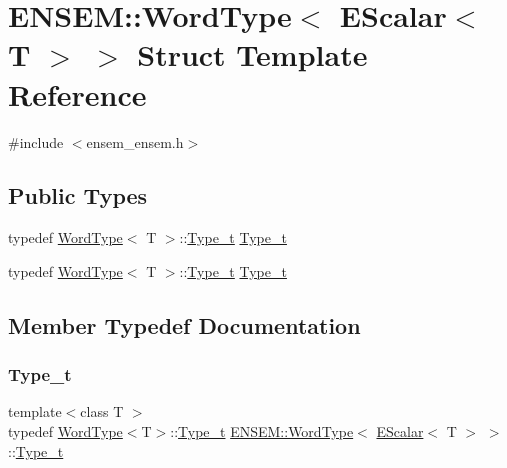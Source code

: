 \hypertarget{structENSEM_1_1WordType_3_01EScalar_3_01T_01_4_01_4}{}\section{E\+N\+S\+EM\+:\+:Word\+Type$<$ E\+Scalar$<$ T $>$ $>$ Struct Template Reference}
\label{structENSEM_1_1WordType_3_01EScalar_3_01T_01_4_01_4}


{\ttfamily \#include $<$ensem\+\_\+ensem.\+h$>$}

\subsection*{Public Types}
\begin{DoxyCompactItemize}
\item 
typedef \mbox{\hyperlink{structENSEM_1_1WordType}{Word\+Type}}$<$ T $>$\+::\mbox{\hyperlink{structENSEM_1_1WordType_3_01EScalar_3_01T_01_4_01_4_adc30dc1892bde666c3cbe7a8ea951497}{Type\+\_\+t}} \mbox{\hyperlink{structENSEM_1_1WordType_3_01EScalar_3_01T_01_4_01_4_adc30dc1892bde666c3cbe7a8ea951497}{Type\+\_\+t}}
\item 
typedef \mbox{\hyperlink{structENSEM_1_1WordType}{Word\+Type}}$<$ T $>$\+::\mbox{\hyperlink{structENSEM_1_1WordType_3_01EScalar_3_01T_01_4_01_4_adc30dc1892bde666c3cbe7a8ea951497}{Type\+\_\+t}} \mbox{\hyperlink{structENSEM_1_1WordType_3_01EScalar_3_01T_01_4_01_4_adc30dc1892bde666c3cbe7a8ea951497}{Type\+\_\+t}}
\end{DoxyCompactItemize}


\subsection{Member Typedef Documentation}
\mbox{\label{structENSEM_1_1WordType_3_01EScalar_3_01T_01_4_01_4_adc30dc1892bde666c3cbe7a8ea951497}} 
\subsubsection{\texorpdfstring{Type\_t}{Type\_t}\hspace{0.1cm}{\footnotesize\ttfamily [1/2]}}
{\footnotesize\ttfamily template$<$class T $>$ \\
typedef \mbox{\hyperlink{structENSEM_1_1WordType}{Word\+Type}}$<$T$>$\+::\mbox{\hyperlink{structENSEM_1_1WordType_3_01EScalar_3_01T_01_4_01_4_adc30dc1892bde666c3cbe7a8ea951497}{Type\+\_\+t}} \mbox{\hyperlink{structENSEM_1_1WordType}{E\+N\+S\+E\+M\+::\+Word\+Type}}$<$ \mbox{\hyperlink{classENSEM_1_1EScalar}{E\+Scalar}}$<$ T $>$ $>$\+::\mbox{\hyperlink{structENSEM_1_1WordType_3_01EScalar_3_01T_01_4_01_4_adc30dc1892bde666c3cbe7a8ea951497}{Type\+\_\+t}}}

